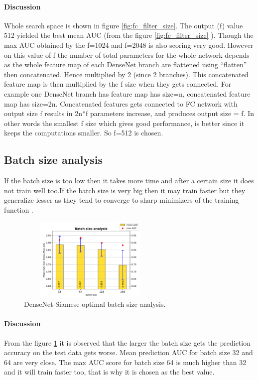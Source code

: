 \paragraph{Discussion\\}
Whole search space is shown in figure \ref{fig:fc_filter_size}. The output (f) value 512 yielded the best mean AUC (from the figure \ref{fig:fc_filter_size} ). Though the max AUC obtained by the f=1024 and f=2048 is also scoring very good.
However on this value of f the number of total parameters for the whole network depends as the whole feature map of each DenseNet branch are flattened using “flatten” then concatenated.
Hence multiplied by 2 (since 2 branches). This concatenated feature map is then multiplied by the f size when they gets connected.
For example one DenseNet branch has feature map has size=n, concatenated feature map has size=2n. Concatenated features gets connected to FC network with output size f results in 2n*f parameters increase, and produces output size = f.
In other words the smallest f size which gives good performance, is better since it keeps the computations smaller. So f=512 is chosen.

\subsection{Batch size analysis}
If the batch size is too low then it takes more time and after a certain size it does not train well too.If the batch size is very big then it may train faster but they generalize lesser as they tend to converge to 
sharp minimizers of the training function \cite{keskar2016large}.

\begin{figure}[ht]
\centering
\includegraphics[width=7cm,height=4cm]{images/densenet/siamese/densenet_siamese_batchsize}
\caption{DenseNet-Siamese optimal batch size analysis.}
\label{fig:batch_size}
\end{figure}

\paragraph{Discussion\\}
From the figure \ref{fig:batch_size} it is observed that the larger the batch size gets the prediction accuracy on the test data gets worse. Mean prediction AUC for batch size 32 and 64 are very close.
The max AUC score for batch size 64 is much higher than 32 and it will train faster too, that is why it is chosen as the best value. 

